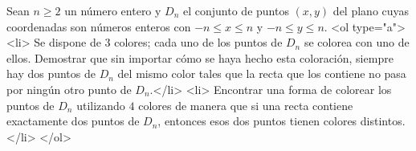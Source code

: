 Sean $n \geq 2$ un número entero y $D_n$ el conjunto de puntos $(x,y)$ del plano cuyas coordenadas son números enteros con $-n \leq x \leq n$ y $-n \leq y \leq n$.
<ol type="a">
  <li> Se dispone de $3$ colores; cada uno de los puntos de $D_n$ se colorea con uno de ellos. Demostrar que sin importar cómo se haya hecho esta coloración, siempre hay dos puntos de $D_n$ del mismo color tales que la recta que los contiene no pasa por ningún otro punto de $D_n$.</li>
  <li> Encontrar una forma de colorear los puntos de $D_n$ utilizando $4$ colores de manera que si una recta contiene exactamente dos puntos de $D_n$, entonces esos dos puntos tienen colores distintos.</li>
</ol>

